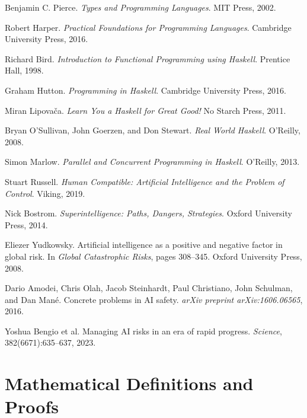 \documentclass[11pt,a4paper]{article}
\begin{document}
\begin{thebibliography}{99}
Benjamin C. Pierce.
\newblock \emph{Types and Programming Languages}.
\newblock MIT Press, 2002.

Robert Harper.
\newblock \emph{Practical Foundations for Programming Languages}.
\newblock Cambridge University Press, 2016.

Richard Bird.
\newblock \emph{Introduction to Functional Programming using Haskell}.
\newblock Prentice Hall, 1998.

Graham Hutton.
\newblock \emph{Programming in Haskell}.
\newblock Cambridge University Press, 2016.

Miran Lipovača.
\newblock \emph{Learn You a Haskell for Great Good!}
\newblock No Starch Press, 2011.

Bryan O'Sullivan, John Goerzen, and Don Stewart.
\newblock \emph{Real World Haskell}.
\newblock O'Reilly, 2008.

Simon Marlow.
\newblock \emph{Parallel and Concurrent Programming in Haskell}.
\newblock O'Reilly, 2013.

Stuart Russell.
\newblock \emph{Human Compatible: Artificial Intelligence and the Problem of Control}.
\newblock Viking, 2019.

Nick Bostrom.
\newblock \emph{Superintelligence: Paths, Dangers, Strategies}.
\newblock Oxford University Press, 2014.

Eliezer Yudkowsky.
\newblock Artificial intelligence as a positive and negative factor in global risk.
\newblock In \emph{Global Catastrophic Risks}, pages 308--345. Oxford University Press, 2008.

Dario Amodei, Chris Olah, Jacob Steinhardt, Paul Christiano, John Schulman, and Dan Mané.
\newblock Concrete problems in {AI} safety.
\newblock \emph{arXiv preprint arXiv:1606.06565}, 2016.

Yoshua Bengio et al.
\newblock Managing {AI} risks in an era of rapid progress.
\newblock \emph{Science}, 382(6671):635--637, 2023.

\end{thebibliography}

\appendix

\section{Mathematical Definitions and Proofs}
\end{document}
